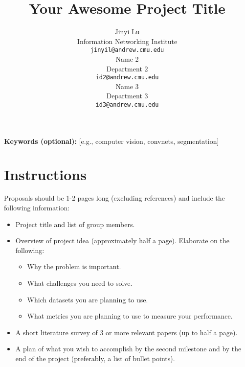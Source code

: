\documentclass{article}
\title{Your Awesome Project Title}
\author{
  Jinyi Lu \\
  Information Networking Institute \\
  \texttt{jinyil@andrew.cmu.edu} \\
  \And
  Name 2 \\
  Department 2\\
  \texttt{id2@andrew.cmu.edu} \\
  \And
  Name 3\\
  Department 3\\
  \texttt{id3@andrew.cmu.edu} \\
}
\begin{document}
\maketitle


\textbf{Keywords (optional):} [e.g., computer vision, convnets, segmentation]

\section*{Instructions}

Proposals should be 1-2 pages long (excluding references) and include the following information:
\begin{itemize}[leftmargin=2em]
    \item Project title and list of group members.

    \item Overview of project idea (approximately half a page). Elaborate on the following:
    \begin{itemize}
        \item Why the problem is important.
        \item What challenges you need to solve.
        \item Which datasets you are planning to use.
        \item What metrics you are planning to use to measure your performance.
    \end{itemize}

    \item A short literature survey of 3 or more relevant papers (up to half a page).

    \item A plan of what you wish to accomplish by the second milestone and by the end of the project (preferably, a list of bullet points).
\end{itemize}

\end{document}
